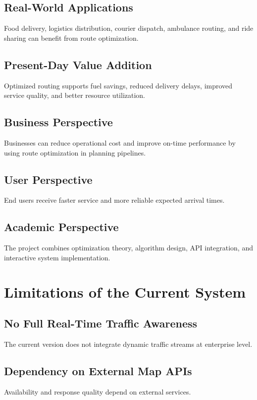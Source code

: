 \documentclass[12pt,a4paper]{report}
\begin{document}
\section{Real-World Applications}
Food delivery, logistics distribution, courier dispatch, ambulance routing, and ride sharing can benefit from route optimization.

\section{Present-Day Value Addition}
Optimized routing supports fuel savings, reduced delivery delays, improved service quality, and better resource utilization.

\section{Business Perspective}
Businesses can reduce operational cost and improve on-time performance by using route optimization in planning pipelines.

\section{User Perspective}
End users receive faster service and more reliable expected arrival times.

\section{Academic Perspective}
The project combines optimization theory, algorithm design, API integration, and interactive system implementation.

\chapter{Limitations of the Current System}

\section{No Full Real-Time Traffic Awareness}
The current version does not integrate dynamic traffic streams at enterprise level.

\section{Dependency on External Map APIs}
Availability and response quality depend on external services.
\end{document}
